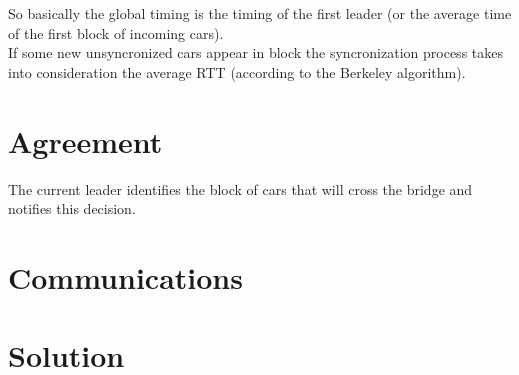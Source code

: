 So basically the global timing is the timing of the first leader (or the average time 
of the first block of incoming cars).\\

If some new unsyncronized cars appear in block the syncronization process takes into 
consideration the average RTT (according to the Berkeley algorithm). 


\section{Agreement}

The current leader identifies the block of cars that will cross the bridge and notifies
this decision.  


\section{Communications}


\section{Solution}